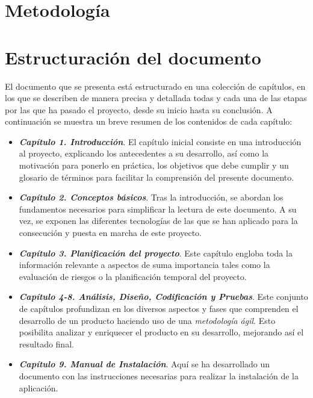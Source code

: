 \section{Metodología}
\lorem{} %

\section{Estructuración del documento}
El documento que se presenta está estructurado en una colección de capítulos, 
en los que se describen de manera precisa y detallada todas y cada una de 
las etapas por las que ha pasado el proyecto, desde su inicio hasta su 
conclusión. A continuación se muestra un breve resumen de los contenidos 
de cada capítulo:

\begin{itemize}
    \item \textbf{\emph{Capítulo 1. Introducción}}. El capítulo inicial 
    consiste en una introducción al proyecto, explicando los antecedentes 
    a su desarrollo, así como la motivación para ponerlo en práctica, los 
    objetivos que debe cumplir y un glosario de términos para facilitar 
    la comprensión del presente documento.

    \item \textbf{\emph{Capítulo 2. Conceptos básicos}}. Tras la introducción,
    se abordan los fundamentos necesarios para simplificar la lectura de 
    este documento. A su vez, se exponen las diferentes tecnologías de las 
    que se han aplicado para la consecución y puesta en marcha de este 
    proyecto.

    \item \textbf{\emph{Capítulo 3. Planificación del proyecto}}. Este 
    capítulo engloba toda la información relevante a aspectos de 
    suma importancia tales como la evaluación de riesgos o la planificación 
    temporal del proyecto.

    \item \textbf{\emph{Capítulo 4-\@8. Análisis, Diseño, Codificación y 
    Pruebas}}. Este conjunto de capítulos profundizan en los diversos 
    aspectos y fases que comprenden el desarrollo de un producto haciendo 
    uso de una \emph{metodología ágil}. Esto posibilita analizar y 
    enriquecer el producto en su desarrollo, mejorando así el resultado 
    final.

    \item \textbf{\emph{Capítulo 9. Manual de Instalación}}. Aquí se 
    ha desarrollado un documento con las instrucciones necesarias 
    para realizar la instalación de la aplicación.


\end{itemize}
